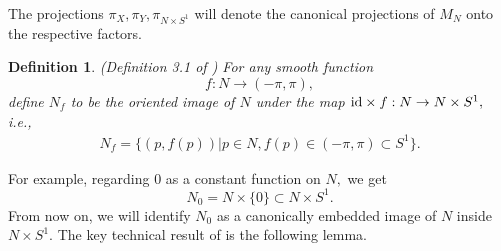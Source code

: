 \documentclass[11pt,a4paper]{amsart}
\numberwithin{equation}{section}
\newcommand{\Si}{\Sigma}
\newcommand{\s}{\subset}
\newcommand{\cz}{\C^{d-\dim N}/\Z^{2(d-\dim N)}}
\newcommand{\Z}{\mathbb{Z}}
\newcommand{\C}{\mathbb{C}}
\newcommand{\id}{\textnormal{id}}
\theoremstyle{plain}
\newtheorem{defn}[exam]{Definition}
\theoremstyle{definition}
\numberwithin{equation}{subsection}
\begin{document}
	The projections $\pi_{X},\pi_Y,\pi_{N\times S^1}$ will denote the canonical projections of $M_N$ onto the respective factors.
	\begin{defn}(Definition 3.1 of \cite{ZLa})
		For any smooth function $$f:N\to (-\pi,\pi),$$ 
		define $N_f$ to be the oriented image of $N$ under the map $\id\times f:N\to N\times S^1,$ i.e.,
		\begin{align*}
			N_f=\{(p,f(p))|p\in N,f(p)\in(-\pi,\pi)\s S^1\}.
		\end{align*}
	\end{defn}
	For example, regarding $0$ as a constant function on $N,$ we get $$N_0=N\times\{0\}\s N\times S^1.$$ From now on, we will identify $N_0$ as a canonically embedded image of $N$ inside $N\times S^1.$%
	The key technical result of \cite{ZLa} is the following lemma.
\end{document}
